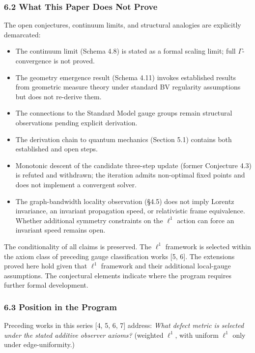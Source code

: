 \documentclass[
]{article}
\providecommand{\tightlist}{%
  \setlength{\itemsep}{0pt}\setlength{\parskip}{0pt}}
\providecommand{\tightlist}{%
  \setlength{\itemsep}{0pt}\setlength{\parskip}{0pt}}
\begin{document}
\subsubsection{6.2 What This Paper Does Not Prove}\label{what-this-paper-does-not-prove}

The open conjectures, continuum limits, and structural analogies are explicitly demarcated:

\begin{itemize}
\tightlist
\item
  The continuum limit (Schema 4.8) is stated as a formal scaling limit; full \(\Gamma\)-convergence is not proved.
\item
  The geometry emergence result (Schema 4.11) invokes established results from geometric measure theory under standard BV regularity assumptions but does not re-derive them.
\item
  The connections to the Standard Model gauge groups remain structural observations pending explicit derivation.
\item
  The derivation chain to quantum mechanics (Section 5.1) contains both established and open steps.
\item
  Monotonic descent of the candidate three-step update (former Conjecture 4.3) is refuted and withdrawn; the iteration admits non-optimal fixed points and does not implement a convergent solver.
\item
  The graph-bandwidth locality observation (§4.5) does not imply Lorentz invariance, an invariant propagation speed, or relativistic frame equivalence. Whether additional symmetry constraints on the \(\ell^1\) action can force an invariant speed remains open.
\end{itemize}

The conditionality of all claims is preserved. The \(\ell^1\) framework is selected within the axiom class of preceding gauge classification works {[}5, 6{]}. The extensions proved here hold given that \(\ell^1\) framework and their additional local-gauge assumptions. The conjectural elements indicate where the program requires further formal development.

\subsubsection{6.3 Position in the Program}\label{position-in-the-program}

Preceding works in this series {[}4, 5, 6, 7{]} address: \emph{What defect metric is selected under the stated additive observer axioms?} (weighted \(\ell^1\), with uniform \(\ell^1\) only under edge-uniformity.)
\end{document}
